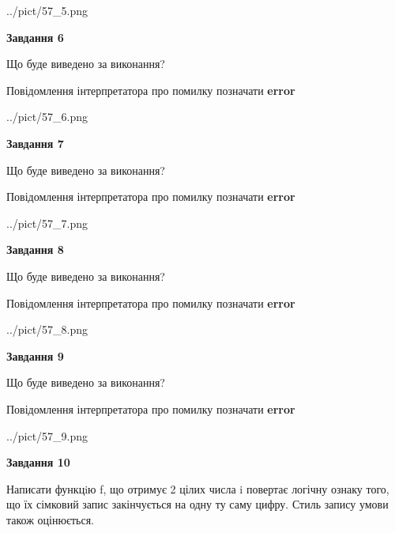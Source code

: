 \documentclass[12pt, ukrainian]{article}
\begin{document}
{\begin {large}
\begin{center}
	{../pict/57_5.png}
\end{center}
\newpage

{\begin {center}\textbf{Завдання 6}\end {center}}\par
Що буде виведено за виконання? \par
Повідомлення інтерпретатора про помилку позначати \textbf{error}

\begin{center}
	{../pict/57_6.png}
\end{center}
\newpage

{\begin {center}\textbf{Завдання 7}\end {center}}\par
Що буде виведено за виконання? \par
Повідомлення інтерпретатора про помилку позначати \textbf{error}

\begin{center}
	{../pict/57_7.png}
\end{center}
\newpage

{\begin {center}\textbf{Завдання 8}\end {center}}\par
Що буде виведено за виконання? \par
Повідомлення інтерпретатора про помилку позначати \textbf{error}

\begin{center}
	{../pict/57_8.png}
\end{center}
\newpage

{\begin {center}\textbf{Завдання 9}\end {center}}\par
Що буде виведено за виконання? \par
Повідомлення інтерпретатора про помилку позначати \textbf{error}

\begin{center}
	{../pict/57_9.png}
\end{center}
\newpage

{\begin {center}\textbf{Завдання 10}\end {center}}\par

Написати функцiю f, що отримує 2 цілих числа i повертає логічну ознаку того, що їх сімковий запис закінчується на одну ту саму цифру. Стиль запису умови також оцінюється.\par
\newpage

\end {large}}
\end{document}
